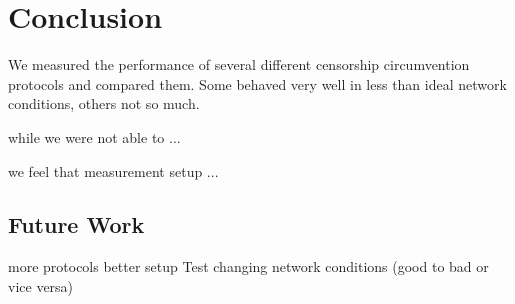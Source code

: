 
\chapter{Conclusion}
\label{chap:conclusion}

We measured the performance of several different censorship circumvention protocols and compared them. Some behaved very well in less than ideal network conditions, others not so much.


while we were not able to ...

we feel that measurement setup ...

\section{Future Work}
more protocols
better setup
Test changing network conditions (good to bad or vice versa)
